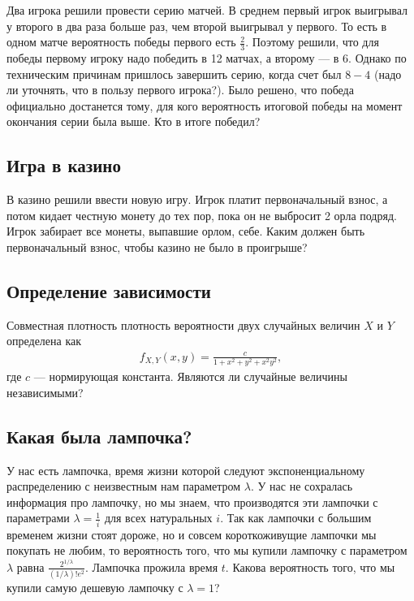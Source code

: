 \documentclass[12pt]{article}
\begin{document}
Два игрока решили провести серию матчей. В среднем первый игрок выигрывал у второго в два раза больше раз, чем второй выигрывал у первого. То есть в одном матче вероятность победы первого есть $\frac{2}{3}$. Поэтому решили, что для победы первому игроку надо победить в 12 матчах, а второму --- в 6. Однако по техническим причинам пришлось завершить серию, когда счет был $8-4$ (надо ли уточнять, что в пользу первого игрока?). Было решено, что победа официально достанется тому, для кого вероятность итоговой победы на момент окончания серии была выше. Кто в итоге победил?



\subsection{Игра в казино}

В казино решили ввести новую игру. Игрок платит первоначальный взнос, а потом кидает честную монету до тех пор, пока он не выбросит 2 орла подряд. Игрок забирает все монеты, выпавшие орлом, себе. Каким должен быть первоначальный взнос, чтобы казино не было в проигрыше?



\subsection{Определение зависимости}

Совместная плотность плотность вероятности двух случайных величин $X$ и $Y$ определена как
\begin{align*}
    f_{X, Y}(x, y) = \frac{c}{1 + x^2 + y^2 + x^2y^2},
\end{align*}
где $c$ --- нормирующая константа. Являются ли случайные величины независимыми?



\subsection{Какая была лампочка?}

У нас есть лампочка, время жизни которой следуют экспоненциальному распределению с неизвестным нам параметром $\lambda$. У нас не сохралась информация про лампочку, но мы знаем, что производятся эти лампочки с параметрами $\lambda = \frac{1}{i}$ для всех натуральных $i$. Так как лампочки с большим временем жизни стоят дороже, но и совсем короткоживущие лампочки мы покупать не любим, то вероятность того, что мы купили лампочку с параметром $\lambda$ равна $\frac{2^{1/\lambda}}{(1/\lambda)!e^2}$. Лампочка прожила время $t$. Какова вероятность того, что мы купили самую дешевую лампочку с $\lambda = 1$?
\end{document}
